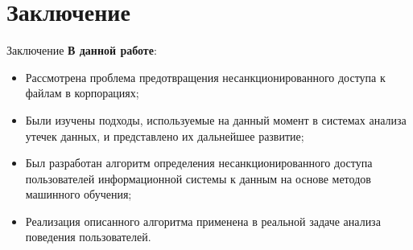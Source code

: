 \documentclass{beamer}
\begin{document}
\section{Заключение}
\begin{frame}{Заключение}
    \textbf{В данной работе}:
    \begin{itemize}
        \item Рассмотрена проблема предотвращения несанкционированного доступа к файлам в корпорациях;
        \item Были изучены подходы, используемые на данный момент в системах анализа утечек данных, и представлено их дальнейшее развитие;
        \item Был разработан алгоритм определения несанкционированного доступа пользователей информационной системы к данным на основе методов машинного обучения;
        \item Реализация описанного алгоритма применена в реальной задаче анализа поведения пользователей.
    \end{itemize}
\end{frame}
\end{document}
